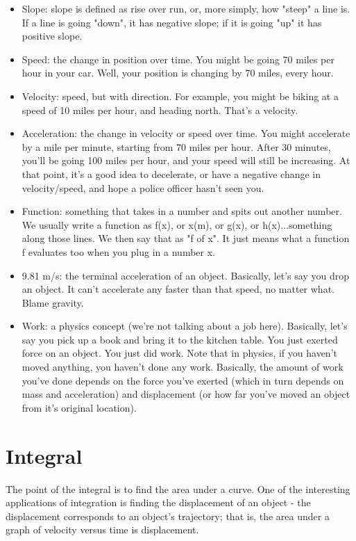 \documentclass[12pt]{article}
\begin{document}
\begin{itemize}
\item Slope: slope is defined as rise over run, or, more simply, how "steep" a line is. 
If a line is going "down", it has negative slope; if it is going "up" it has positive slope.
\item Speed: the change in position over time. 
You might be going 70 miles per hour in your car. 
Well, your  position is changing by 70 miles, every hour.
\item Velocity: speed, but with direction. 
For example, you might be biking at a speed of 10 miles per hour, and heading north. 
That's a velocity.
\item Acceleration: the change in velocity or speed over time. 
You might accelerate by a mile per minute, starting from 70 miles per hour. 
After 30 minutes, you'll be going 100 miles per hour, and your
speed will still be increasing. At that point, it's a good idea to
decelerate, or have a negative change in velocity/speed, and hope a
police officer hasn't seen you.
\item Function: something that takes in a number and spits out another
number. We usually write a function as f(x), or x(m), or g(x), or
h(x)...something along those lines. We then say that as "f of x". It
just means what a function f evaluates too when you plug in a number
x.
\item 9.81 m/s: the terminal acceleration of an object. Basically,
let's say you drop an object. It can't accelerate any faster than that
speed, no matter what. Blame gravity.
\item Work: a physics concept (we're not talking about a job here).
Basically, let's say you pick up a book and bring it to the kitchen
table. You just exerted force on an object. You just did work. Note
that in physics, if you haven't moved anything, you haven't done any
work. Basically, the amount of work you've done depends on the force
you've exerted (which in turn depends on mass and acceleration) and
displacement (or how far you've moved an object from it's original
location).
\end{itemize}

\section{Integral}

The point of the integral is to find the area under a curve. 
One of the interesting applications of integration is finding the displacement of an object - the displacement corresponds to an object's trajectory; that is, the area under a graph of velocity versus time is displacement.
\end{document}
